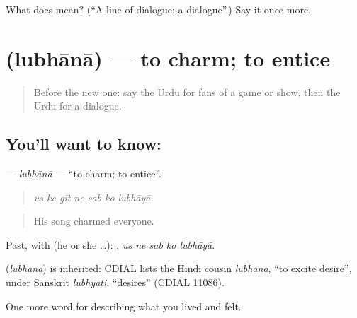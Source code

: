 \begin{tcolorbox}[breakable,colback=teal!4,colframe=teal!35!black,title={Before you move on}]
What does  mean? (\textquotedblleft{}A line of dialogue; a dialogue\textquotedblright{}.) Say it once more.
\end{tcolorbox}
\section[\texorpdfstring{\ur{لبھانا} (lubhānā)}{لبھانا (lubhānā)}]{ (lubhānā) — to charm; to entice}

\label{lesson:UR-C517-lubhana}



\begin{quote}
Before the new one: say the Urdu for fans of a game or show, then the Urdu for a dialogue.
\end{quote}

\subsection*{You'll want to know: }
\textbf{} — \emph{lubhānā} — \textquotedblleft{}to charm; to entice\textquotedblright{}.

\begin{quote}
      
\end{quote}

\begin{quote}
\emph{us ke gīt ne sab ko lubhāyā.}
\end{quote}

\begin{quote}
His song charmed everyone.
\end{quote}

Past, with  (he or she …):     , \emph{us ne sab ko lubhāyā}.

\begin{cousinweb}
\textbf{} (\emph{lubhānā}) is inherited: CDIAL lists the Hindi cousin \emph{lubhānā}, \textquotedblleft{}to excite desire\textquotedblright{}, under Sanskrit \emph{lubhyati}, \textquotedblleft{}desires\textquotedblright{} (CDIAL 11086).
\end{cousinweb}

\begin{grammarlens}[title={What you've built}]
One more word for describing what you lived and felt.
\end{grammarlens}


